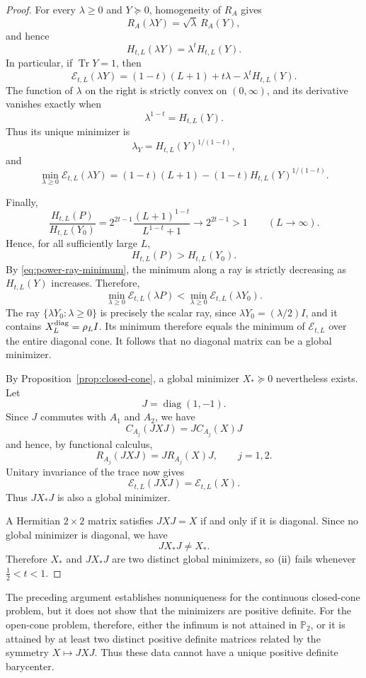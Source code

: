 \documentclass[11pt]{amsart}
\theoremstyle{definition}
\theoremstyle{remark}
\newcommand{\Tr}{\operatorname{Tr}}
\begin{document}
\begin{proof}
		For every $\lambda\ge0$ and $Y\succeq0$, homogeneity of $R_A$ gives
		\[
		R_A(\lambda Y)=\sqrt{\lambda}\,R_A(Y),
		\]
		and hence
		\[
		H_{t,L}(\lambda Y)=\lambda^tH_{t,L}(Y).
		\]
		In particular, if $\Tr Y=1$, then
		\[
		\mathcal E_{t,L}(\lambda Y)
		=(1-t)(L+1)+t\lambda
		-\lambda^tH_{t,L}(Y).
		\]
		The function of $\lambda$ on the right is strictly convex on
		$(0,\infty)$, and its derivative vanishes exactly when
		\[
		\lambda^{1-t}=H_{t,L}(Y).
		\]
		Thus its unique minimizer is
		\[
		\lambda_Y=H_{t,L}(Y)^{1/(1-t)},
		\]
		and
		\begin{equation}\label{eq:power-ray-minimum}
			\min_{\lambda\ge0}\mathcal E_{t,L}(\lambda Y)
			=(1-t)(L+1)
			-(1-t)H_{t,L}(Y)^{1/(1-t)}.
		\end{equation}
		
		Finally,
		\[
		\frac{H_{t,L}(P)}{H_{t,L}(Y_0)}
		=
		2^{2t-1}
		\frac{(L+1)^{1-t}}{L^{1-t}+1}
		\longrightarrow 2^{2t-1}>1
		\qquad (L\to\infty).
		\]
		Hence, for all sufficiently large $L$,
		\[
		H_{t,L}(P)>H_{t,L}(Y_0).
		\]
		By \eqref{eq:power-ray-minimum}, the minimum along a ray is strictly
		decreasing as $H_{t,L}(Y)$ increases.  Therefore,
		\[
		\min_{\lambda\ge0}\mathcal E_{t,L}(\lambda P)
		<
		\min_{\lambda\ge0}\mathcal E_{t,L}(\lambda Y_0).
		\]
		The ray $\{\lambda Y_0:\lambda\ge0\}$ is precisely the scalar ray,
		since $\lambda Y_0=(\lambda/2)I$, and it contains
		$X_L^{\rm diag}=\rho_LI$.  Its minimum therefore equals the minimum
		of $\mathcal E_{t,L}$ over the entire diagonal cone.  It follows that
		no diagonal matrix can be a global minimizer.
		
		By Proposition~\ref{prop:closed-cone}, a global minimizer
		$X_*\succeq0$ nevertheless exists.  Let
		\[
		J=\operatorname{diag}(1,-1).
		\]
		Since $J$ commutes with $A_1$ and $A_2$, we have
		\[
		C_{A_j}(JXJ)=JC_{A_j}(X)J
		\]
		and hence, by functional calculus,
		\[
		R_{A_j}(JXJ)=JR_{A_j}(X)J,
		\qquad j=1,2.
		\]
		Unitary invariance of the trace now gives
		\[
		\mathcal E_{t,L}(JXJ)=\mathcal E_{t,L}(X).
		\]
		Thus $JX_*J$ is also a global minimizer.
		
		A Hermitian $2\times2$ matrix satisfies $JXJ=X$ if and only if it is
		diagonal.  Since no global minimizer is diagonal, we have
		\[
		JX_*J\ne X_*.
		\]
		Therefore $X_*$ and $JX_*J$ are two distinct global minimizers, so
		${\rm(ii)}$ fails whenever $\frac12<t<1$.
\end{proof}
	
The preceding argument establishes nonuniqueness for the continuous
closed-cone problem, but it does not show that the minimizers are positive
definite.  For the open-cone problem, therefore, either the infimum is not
attained in $\mathbb P_2$, or it is attained by at least two distinct
positive definite matrices related by the symmetry $X\mapsto JXJ$.
Thus these data cannot have a unique positive definite barycenter.
	
\end{document}
